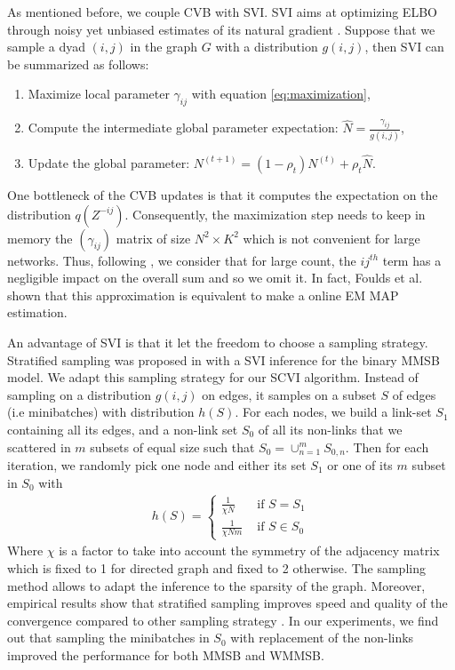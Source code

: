 As mentioned before, we couple CVB with SVI. SVI aims at optimizing ELBO through noisy yet unbiased estimates of its natural gradient \cite{hoffman2013stochastic}. %
Suppose  that we sample a dyad $(i,j)$ in the graph $G$ with a distribution $g(i,j)$, then SVI can be summarized as follows:
\begin{enumerate}
\item Maximize local parameter $\gamma_{ij}$ with equation \eqref{eq:maximization},
\item Compute the intermediate global parameter expectation: $\hat N = \frac{\gamma_{ij}}{g(i,j)}$,
\item Update the global parameter: $N^{(t+1)} = (1-\rho_t)N^{(t)} + \rho_t \hat N$.
\end{enumerate}

One bottleneck of the CVB updates is that it computes the expectation on the distribution $q(Z^{-ij})$. Consequently, the maximization step needs to keep in memory the $(\gamma_{ij})$ matrix of size $N^2\times K^2$ which is not convenient for large networks. Thus, following \cite{foulds2013stochastic}, we consider that for large count, the $ij^{th}$ term has a negligible impact on the overall sum and so we omit it. In fact, Foulds et al. shown that this approximation is equivalent to make a online EM MAP estimation.

An advantage of SVI is that it let the freedom to choose a sampling strategy. Stratified sampling was proposed in \cite{gopalan2013efficient} with a SVI inference for the binary MMSB model. We adapt this sampling strategy for our SCVI algorithm. Instead of sampling on a distribution $g(i,j)$ on edges, it samples on a subset $S$ of edges (i.e minibatches) with distribution $h(S)$. For each nodes, we build a link-set $S_1$ containing all its edges, and a non-link set $S_0$ of all its non-links that we scattered in $m$ subsets of equal size such that $S_0 = \cup_{n=1}^m S_{0,n}$. Then for each iteration, we randomly pick one node and either its set $S_1$ or one of its $m$ subset in $S_0$ with
\begin{align*}
h(S)=\begin{cases}
    \frac{1}{\chi N}  & \textrm{ if } S = S_1 \\
    \frac{1}{\chi N m}  & \textrm{ if } S \in S_0 
    \end{cases}
\end{align*}
Where $\chi$ is a factor to take into account the symmetry of the adjacency matrix which is fixed to 1 for directed graph and fixed to 2 otherwise. The sampling method allows to adapt the inference to the sparsity of the graph. Moreover, empirical results show that stratified sampling improves speed and quality of the convergence compared to other sampling strategy \cite{gopalan2013efficient}\cite{kim2013efficient}. In our experiments, we find out that sampling the minibatches in $S_0$ with replacement of the non-links improved the performance for both MMSB and WMMSB.

